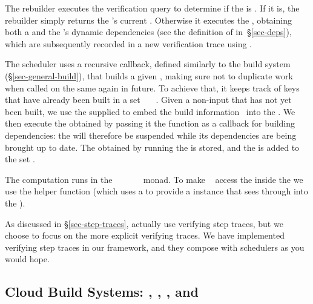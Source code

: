 The rebuilder executes the verification query  to determine if the
 is . If it is, the rebuilder simply returns the 's
current . Otherwise it executes the , obtaining both a
 and the 's dynamic dependencies  (see the
definition of  in~\S\ref{sec-deps}), which are subsequently recorded
in a new verification trace using .

The  scheduler uses a recursive  callback, defined
similarly to the  build system (\S\ref{sec-general-build}), that builds
a given , making sure not to duplicate work when called on the same
 again in future. To achieve that, it keeps track of keys that have
already been built in a set ~\hs{::}~~. Given a non-input
 that has not yet been built, we use the supplied  to
embed the build information~ into the . We then execute the
obtained  by passing it the  function as a callback for
building dependencies: the  will therefore be suspended while its
dependencies are being brought up to date. The  obtained by running
the  is stored, and the  is added to the set .

The  computation runs in the
~~~~~~ monad. To make
~ access the  inside the  we use the helper
function  (which uses a  to provide a 
instance that sees through into the ).

As discussed in \S\ref{sec-step-traces}, \Shake actually use verifying step traces, but we
choose to focus on the more explicit verifying traces. We have implemented
verifying step traces in our framework, and they compose with schedulers as
you would hope.

\subsection{Cloud Build Systems: \Bazel, \CloudBuild, \Cloud \Shake, \Buck and \Nix}
\label{sec-implementation-cloud}


